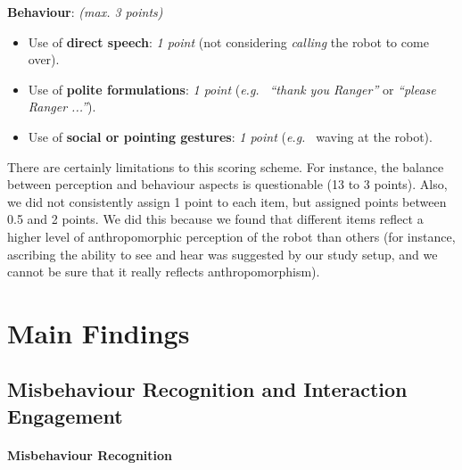 \documentclass{sig-alternate}
\newcommand{\eg}{{\textit{e.g.~}}}
\begin{document}
\textbf{Behaviour}: \textit{(max. 3 points)}
\begin{itemize}
    \item Use of \textbf{direct speech}: \textit{1 point} (not considering
        \textit{calling} the robot to come over).

    \item Use of \textbf{polite formulations}: \textit{1 point} (\eg
        \textit{``thank you Ranger''} or \textit{``please Ranger ...''}).

    \item Use of \textbf{social or pointing gestures}: \textit{1 point} (\eg
        waving at the robot).

\end{itemize}

There are certainly limitations to this scoring scheme. For instance, the
balance between perception and behaviour aspects is questionable (13 to 3
points). Also, we did not consistently assign 1 point to each item, but assigned
points between 0.5 and 2 points. We did this because we found that different
items reflect a higher level of anthropomorphic perception of the robot than
others (for instance, ascribing the ability to see and hear was suggested by our
study setup, and we cannot be sure that it really reflects anthropomorphism).

\section{Main Findings}

\subsection{Misbehaviour Recognition and Interaction Engagement}

\paragraph{Misbehaviour Recognition}
\end{document}
